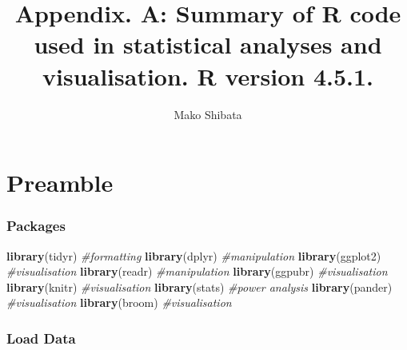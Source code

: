 \documentclass[
]{article}
\title{Appendix. A: Summary of R code used in statistical analyses and
visualisation. R version 4.5.1.}
\author{Mako Shibata}
\date{}
\newenvironment{Shaded}{\begin{snugshade}}{\end{snugshade}}
\newcommand{\CommentTok}[1]{\textcolor[rgb]{0.56,0.35,0.01}{\textit{#1}}}
\newcommand{\FunctionTok}[1]{\textcolor[rgb]{0.13,0.29,0.53}{\textbf{#1}}}
\newcommand{\NormalTok}[1]{#1}
\begin{document}
\maketitle

\section{Preamble}\label{preamble}

\subsubsection{Packages}\label{packages}

\begin{Shaded}
\begin{Highlighting}[]
\FunctionTok{library}\NormalTok{(tidyr) }\CommentTok{\#formatting}
\FunctionTok{library}\NormalTok{(dplyr) }\CommentTok{\#manipulation }
\FunctionTok{library}\NormalTok{(ggplot2) }\CommentTok{\#visualisation}
\FunctionTok{library}\NormalTok{(readr) }\CommentTok{\#manipulation}
\FunctionTok{library}\NormalTok{(ggpubr) }\CommentTok{\#visualisation}
\FunctionTok{library}\NormalTok{(knitr) }\CommentTok{\#visualisation}
\FunctionTok{library}\NormalTok{(stats) }\CommentTok{\#power analysis}
\FunctionTok{library}\NormalTok{(pander) }\CommentTok{\#visualisation}
\FunctionTok{library}\NormalTok{(broom) }\CommentTok{\#visualisation}
\end{Highlighting}
\end{Shaded}

\subsubsection{Load Data}\label{load-data}
\end{document}

